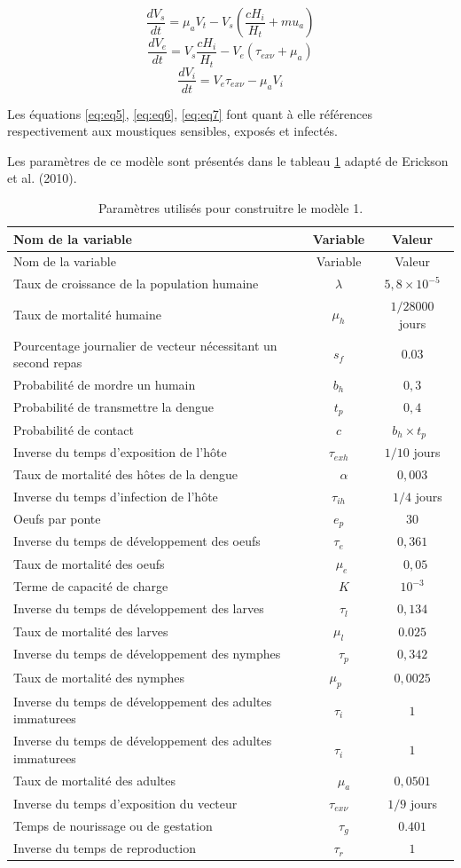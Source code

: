 \documentclass[
  12pt,
  french,
  oneside]{article}
\begin{document}
\begin{equation} \frac{dV_s}{dt} = \mu_aV_t - V_s \left(\frac{cH_i}{H_t} + mu_a\right)\label{eq:eq5}\end{equation}
\begin{equation} \frac{dV_e}{dt} = V_s \frac{cH_i}{H_t} - V_e \left(\tau_{ex\nu} + \mu_a\right)\label{eq:eq6}\end{equation}
\begin{equation} \frac{dV_i}{dt} = V_e\tau_{ex\nu} - \mu_aV_i \label{eq:eq7}\end{equation}

Les équations \ref{eq:eq5}, \ref{eq:eq6}, \ref{eq:eq7} font quant à elle
références respectivement aux moustiques sensibles, exposés et infectés.

Les paramètres de ce modèle sont présentés dans le tableau \ref{tbl:1}
adapté de Erickson et al. (2010).

\begin{longtable}[]{@{}lcc@{}}
\caption{Paramètres utilisés pour construitre le modèle 1.
\label{tbl:1}}\tabularnewline
\toprule
Nom de la variable & Variable & Valeur\tabularnewline
\midrule
\endfirsthead
\toprule
Nom de la variable & Variable & Valeur\tabularnewline
\midrule
\endhead
Taux de croissance de la population humaine & \(\lambda\) &
\(5,8\times 10^{-5}\)\tabularnewline
Taux de mortalité humaine & \(\mu_h\) & \(1/28000\) jours\tabularnewline
Pourcentage journalier de vecteur nécessitant un second repas & \(s_f\)
& \(0.03\)\tabularnewline
Probabilité de mordre un humain & \(b_h\) & \(0,3\)\tabularnewline
Probabilité de transmettre la dengue & \(t_p\) & \(0,4\)\tabularnewline
Probabilité de contact & \(c\) & \(b_h \times t_p\)~\tabularnewline
Inverse du temps d'exposition de l'hôte & \(\tau_{exh}\) & \(1/10\)
jours\tabularnewline
Taux de mortalité des hôtes de la dengue & ~ \(\alpha\) &
\(0,003\)\tabularnewline
Inverse du temps d'infection de l'hôte & \(\tau_{ih}\) & ~ \(1/4\)
jours\tabularnewline
Oeufs par ponte & \(e_p\) & \(30\)\tabularnewline
Inverse du temps de développement des oeufs & \(\tau_e\) &
\(0,361\)\tabularnewline
Taux de mortalité des oeufs & ~\(\mu_e\) & ~\(0,05\)\tabularnewline
Terme de capacité de charge & ~ \(K\) & \(10^{-3}\)\tabularnewline
Inverse du temps de développement des larves & ~ \(\tau_l\) &
\(0,134\)\tabularnewline
Taux de mortalité des larves & \(\mu_l\) & \(0.025\)\tabularnewline
Inverse du temps de développement des nymphes & ~ \(\tau_p\) &
\(0,342\)\tabularnewline
Taux de mortalité des nymphes & \(\mu_p\)~ & \(0,0025\)\tabularnewline
Inverse du temps de développement des adultes immaturees & \(\tau_i\) &
\(1\)\tabularnewline
Inverse du temps de développement des adultes immaturees & \(\tau_i\) &
\(1\)\tabularnewline
Taux de mortalité des adultes & ~ \(\mu_a\) & \(0,0501\)\tabularnewline
Inverse du temps d'exposition du vecteur & \(\tau_{ex\nu}\) & \(1/9\)
jours\tabularnewline
Temps de nourissage ou de gestation & ~ \(\tau_g\) &
\(0.401\)\tabularnewline
Inverse du temps de reproduction & \(\tau_r\) & \(1\)\tabularnewline
\bottomrule
\end{longtable}
\end{document}
